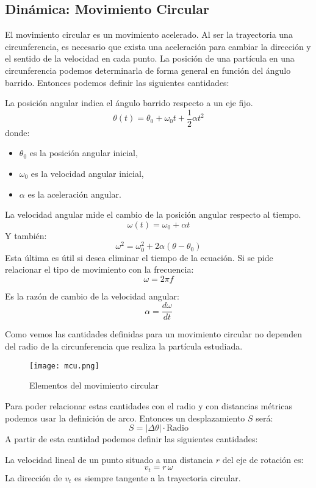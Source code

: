 \subsection{Dinámica: Movimiento Circular}
\label{sec:mcu}

El movimiento circular es un movimiento acelerado. Al ser la trayectoria una circunferencia, es necesario que exista una aceleración para cambiar la dirección y el sentido de la velocidad en cada punto. La posición de una partícula en una circunferencia podemos determinarla de forma general en función del ángulo barrido. Entonces podemos definir las siguientes cantidades:

\begin{tcolorbox}[remember, title=Posición angular (\(\theta\))]
  La posición angular indica el ángulo barrido respecto a un eje fijo.
  \[
  \theta(t) = \theta_0 + \omega_0 t + \frac{1}{2} \alpha t^2
  \]
  donde:
  \begin{itemize}
    \item \(\theta_0\) es la posición angular inicial,
    \item \(\omega_0\) es la velocidad angular inicial,
    \item \(\alpha\) es la aceleración angular.
  \end{itemize}
\end{tcolorbox}

\begin{tcolorbox}[remember, title=Velocidad angular (\(\omega\))]
La velocidad angular mide el cambio de la posición angular respecto al tiempo.
\[
\omega(t) = \omega_0 + \alpha t
\]
Y también:
\[
\omega^2 = \omega_0^2 + 2\alpha(\theta - \theta_0)
\]
Esta última es útil si desea eliminar el tiempo de la ecuación. Si se pide relacionar el tipo de movimiento con la frecuencia:
\[
  \omega = 2 \pi f
\]
\end{tcolorbox}

\begin{tcolorbox}[remember, title=Aceleración angular (\(\alpha\))]  
Es la razón de cambio de la velocidad angular:
\[
\alpha = \frac{d\omega}{dt}
\]
\end{tcolorbox}
Como vemos las cantidades definidas para un movimiento circular no dependen del radio de la circunferencia que realiza la partícula estudiada. 
\begin{figure}[ht]
  \centering
  \texttt{[image: mcu.png]}
  \caption{Elementos del movimiento circular}
\end{figure}
Para poder relacionar estas cantidades con el radio y con distancias métricas podemos usar la definición de arco. Entonces un desplazamiento \(S\) será:
\[
S = \left\lvert \Delta \theta \right\rvert \cdot \text{Radio}
\]
A partir de esta cantidad podemos definir las siguientes cantidades:
\begin{tcolorbox}[remember, title=Velocidad tangencial (\(v_t\))]  
La velocidad lineal de un punto situado a una distancia \( r \) del eje de rotación es:
\[
v_t = r \, \omega
\]
La dirección de \( v_t \) es siempre tangente a la trayectoria circular.
\end{tcolorbox}

